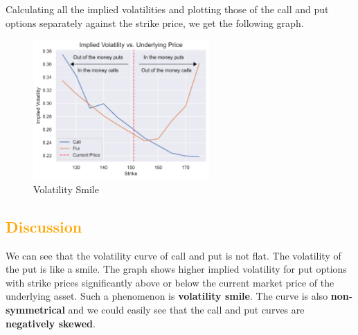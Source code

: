 \documentclass[11pt,en]{elegantpaper}
\begin{document}
Calculating all the implied volatilities and plotting those of the call and put options separately against the strike price, we get the following graph.

\begin{figure}[htbp] 
    \centering 
    \includegraphics[width=0.6\textwidth]{./image/image_2/ImpliedVolatility.png} 
    \caption{Volatility Smile}
\end{figure}

\subsection*{\textcolor{orange}{Discussion}}

We can see that the volatility curve of call and put is not flat. The volatility of the put is like a smile. The graph shows higher implied volatility for put options with strike prices significantly above or below the current market price of the underlying asset. Such a phenomenon is \textbf{volatility smile}. The curve is also \textbf{non-symmetrical} and we could easily see that the call and put curves are \textbf{negatively skewed}.
\end{document}
